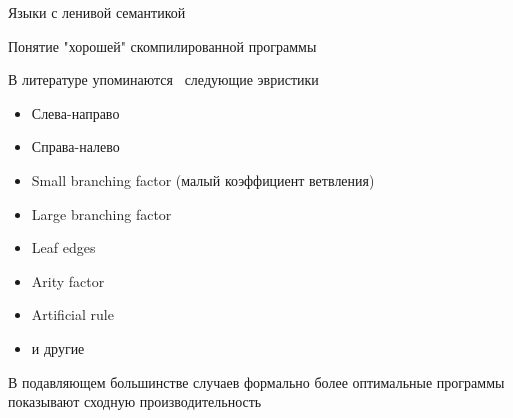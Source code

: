 \documentclass[aspectratio=169
  , xcolor={svgnames}
  , hyperref={ colorlinks,citecolor=Blue
             , linkcolor=DarkRed,urlcolor=DarkBlue}
  , russian
  ]{beamer}
\begin{document}


\begin{frame}[fragile]{Языки с ленивой семантикой}
\begin{minipage}[t]{0.45\linewidth}
\begin{minipage}{0.5\linewidth}

\haskellDemo
\end{minipage}
\end{minipage}\hspace{0.1cm}
\begin{minipage}[t]{0.45\linewidth}
\end{minipage}
\end{frame}

\begin{frame}{Понятие "хорошей" скомпилированной программы}
\begin{minipage}[t]{0.45\linewidth}
В литературе упоминаются~\cite{Scott2000WhenDM} следующие эвристики
\begin{itemize}
\item Слева-направо
\item Справа-налево
\item Small branching factor (малый коэффициент ветвления)
\item Large branching factor 
\item Leaf edges 
\item Arity factor
\item Artificial rule
\item и другие
\end{itemize}
\end{minipage}\hspace{1cm}
\begin{minipage}[t]{0.45\linewidth}
В подавляющем большинстве случаев формально более оптимальные программы показывают сходную производительность
\end{minipage}
\end{frame}
\end{document}
